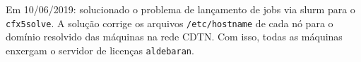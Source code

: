 



Em 10/06/2019: solucionado o problema de lançamento de jobs via slurm para 
o \texttt{cfx5solve}. A solução corrige os arquivos \texttt{/etc/hostname} de cada 
nó para o domínio resolvido das máquinas na rede CDTN. Com isso, todas as máquinas 
enxergam o servidor de licenças \texttt{aldebaran}.



